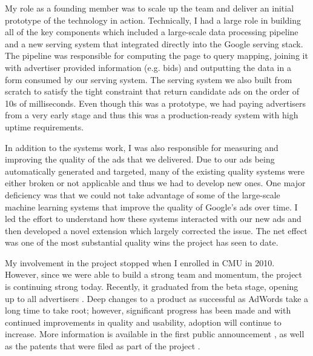 \documentclass[12pt]{article}
\begin{document}
My role as a founding member was to scale up the team and deliver an initial prototype of the technology in action. Technically, I had a large role in building all of the key components which included a large-scale data processing pipeline and a new serving system that integrated directly into the Google serving stack. The pipeline was responsible for computing the page to query mapping, joining it with advertiser provided information (e.g. bids) and outputting the data in a form consumed by our serving system. The serving system we also built from scratch to satisfy the tight constraint that return candidate ads on the order of 10s of milliseconds. Even though this was a prototype, we had paying advertisers from a very early stage and thus this was a production-ready system with high uptime requirements.

In addition to the systems work, I was also responsible for measuring and improving the quality of the ads that we delivered. Due to our ads being automatically generated and targeted, many of the existing quality systems were either broken or not applicable and thus we had to develop new ones. One major deficiency was that we could not take advantage of some of the large-scale machine learning systems that improve the quality of Google's ads over time. I led the effort to understand how these systems interacted with our new ads and then developed a novel extension which largely corrected the issue. The net effect was one of the most substantial quality wins the project has seen to date.

My involvement in the project stopped when I enrolled in CMU in 2010. However, since we were able to build a strong team and momentum, the project is continuing strong today. Recently, it graduated from the beta stage, opening up to all advertisers \cite{jain}. Deep changes to a product as successful as AdWords take a long time to take root; however, significant progress has been made and with continued improvements in quality and usability, adoption will continue to increase. More information is available in the first public announcement \cite{gultekin}, as well as the patents that were filed as part of the project \cite{brunsman,brunsman2,brunsman3}.

\renewcommand{\refname}{\vskip -1.5cm}
\footnotesize


\end{document}
